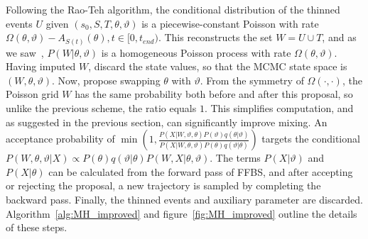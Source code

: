 Following the Rao-Teh algorithm, the conditional distribution of the thinned events $U$ given $(s_0,S,T,\theta,\vartheta)$ is a piecewise-constant Poisson with rate $\Omega(\theta, \vartheta) - A_{S(t)}(\theta), t \in [0,t_{end})$. 
This reconstructs the set $W = U \cup T$,  and as we saw~\citep[see also][]{RaoTeh13}, $P(W|\theta,\vartheta)$ is a homogeneous Poisson process with rate $\Omega(\theta, \vartheta)$. 
Having imputed $W$, discard the state values, so that the MCMC state space is $(W, \theta, \vartheta)$.
Now, propose swapping $\theta$ with $\vartheta$. 
From the symmetry of $\Omega(\cdot,\cdot)$, the Poisson grid $W$ has the same probability both
before and after this proposal, so unlike the previous scheme, the ratio %
equals $1$.  
This simplifies computation, and as suggested in the previous section, can significantly improve mixing.
An acceptance probability of
$ 
  \min\left(1, \frac{P(X|W,\vartheta,\theta) P(\vartheta) q(\theta|\vartheta)}
   {P(X|W,\theta,\vartheta) P(\theta)q(\vartheta|\theta)}\right)
   $ 
   targets the conditional $P(W,\theta,\vartheta|X) \propto P(\theta)q(\vartheta|\theta)P(W,X|\theta,\vartheta)$.
   The terms $P(X|\vartheta)$ and  $P(X|\theta)$ can be calculated from the forward pass of FFBS, and after
   accepting or rejecting the proposal, a new trajectory is sampled by
   completing the backward pass. Finally, the thinned events and auxiliary parameter are
   discarded. Algorithm~\ref{alg:MH_improved} and 
   figure~\ref{fig:MH_improved} outline the details of these steps. 

